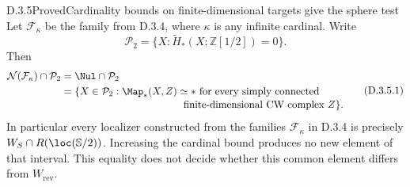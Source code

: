 \begin{claim}{D.3.5}{Proved}{Cardinality bounds on finite-dimensional targets give the sphere test}
Let $\mathcal F_\kappa$ be the family from D.3.4, where
$\kappa$ is any infinite cardinal. Write
\[
 \mathcal P_2=\{X:\widetilde H_*(X;\mathbb Z[1/2])=0\}.
\]
Then
\[
 \begin{aligned}
 \mathcal N(\mathcal F_\kappa)\cap\mathcal P_2
   &=\Nul\cap\mathcal P_2\\
   &=\{X\in\mathcal P_2:
       \Map_*(X,Z)\simeq *\text{ for every simply connected}\\[-2pt]
   &\hspace{42mm}\text{finite-dimensional CW complex }Z\}.
 \end{aligned}
 \tag{D.3.5.1}
\]
In particular every localizer constructed from the families
$\mathcal F_\kappa$ in D.3.4 is precisely
$W_S\cap R(\loc(\mathbb S/2))$.
Increasing the cardinal bound produces no new element of that
interval. This equality does not decide whether this common
element differs from $W_{\mathrm{rev}}$.
\end{claim}
